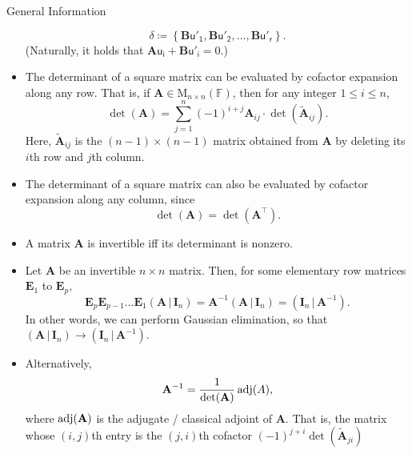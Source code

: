 \documentclass[../Notes.tex]{subfiles}
\begin{document}
\begin{stbox}{General Information}
\begin{itemize}
            \[\delta\coloneq\left\{\mathbf{B}\mathsf{u'_1},\mathbf{B}\mathsf{u'_2},\dots,\mathbf{B}\mathsf{u'_r}\right\}.\]
            (Naturally, it holds that \(\mathbf{A}\mathsf{u_i}+\mathbf{B}\mathsf{u'_i}=0\).)
            \item The determinant of a square matrix can be evaluated by cofactor expansion along any row. That is, if \(\mathbf{A} \in \mathrm{M}_{n\times n}(\mathbb{F})\), then for any integer \(1\leq i\leq n\),
            \[\det(\mathbf{A})=\sum_{j=1}^{n}{(-1)}^{i+j}\mathbf{A}_{ij}\cdot \det(\widetilde{\mathbf{A}}_{ij}).\] 
            Here, \(\widetilde{\mathbf{A}}_{ij}\) is the \((n-1)\times(n-1)\) matrix obtained from \(\mathbf{A}\) by deleting its \(i\)th row and \(j\)th column.
            \item The determinant of a square matrix can also be evaluated by cofactor expansion along any column, since
            \[\det(\mathbf{A})=\det(\mathbf{A}^\top).\]
            \item A matrix \(\mathbf{A}\) is invertible iff its determinant is nonzero. 
            \item Let \(\mathbf{A}\) be an invertible \(n\times n\) matrix. Then, for some elementary row matrices \(\mathbf{E}_1\) to \(\mathbf{E}_p\),
            \[\mathbf{E}_p\mathbf{E}_{p-1}\dots \mathbf{E}_1(\mathbf{A} \,\vert\, \mathbf{I}_n)=\mathbf{A}^{-1}(\mathbf{A} \,\vert\, \mathbf{I}_n)=(\mathbf{I}_n \,\vert\, \mathbf{A}^{-1}).\]
            In other words, we can perform Gaussian elimination, so that \((\mathbf{A} \,\vert\, \mathbf{I}_n)\to (\mathbf{I}_n \,\vert\, \mathbf{A}^{-1})\).
            \item Alternatively,
            \[\mathbf{A}^{-1}=\frac{1}{\det(\mathbf{A})}\operatorname{adj}(A),\]
            where \(\operatorname{adj}(\mathbf{A})\) is the adjugate / classical adjoint of \(\mathbf{A}\). That is, the matrix whose \((i,j)\)th entry is the \((j,i)\)th cofactor \((-1)^{j+i}\det(\widetilde{\mathbf{A}}_{ji})\)
        \end{itemize}
    \end{stbox}
    
\end{document}
